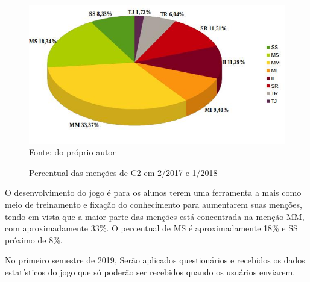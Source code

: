 \begin{figure}[H]
\centering
\caption{Percentual das menções de C2 em 2/2017 e 1/2018}
\includegraphics[scale=0.72]{figuras/grafico_media.jpg}
\label{figuramencao}
\small{Fonte: do próprio autor}
\end{figure}

O desenvolvimento do jogo é para os alunos terem uma ferramenta a mais como meio de treinamento e fixação do conhecimento para aumentarem suas menções, tendo em vista que a maior parte das menções está concentrada na menção MM, com aproximadamente 33\%. O percentual de MS é aproximadamente 18\% e SS próximo de 8\%.

No primeiro semestre de 2019, 
Serão aplicados questionários e recebidos os dados estatísticos do jogo que só poderão ser recebidos quando os usuários enviarem. 